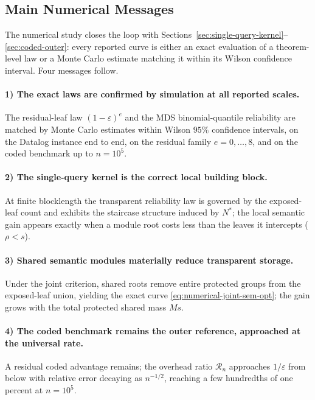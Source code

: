 \documentclass[journal]{IEEEtran}
\numberwithin{equation}{section}
\begin{document}
\subsection*{Main Numerical Messages}
The numerical study closes the loop with
Sections~\ref{sec:single-query-kernel}--\ref{sec:coded-outer}: every
reported curve is either an exact evaluation of a theorem-level law or a
Monte Carlo estimate matching it within its Wilson confidence interval.
Four messages follow.

\paragraph*{1) The exact laws are confirmed by simulation at all reported
scales.}
The residual-leaf law \((1-\varepsilon)^{e}\) and the MDS binomial-quantile
reliability are matched by Monte Carlo estimates within Wilson \(95\%\)
confidence intervals, on the Datalog instance end to end, on the residual
family \(e=0,\ldots,8\), and on the coded benchmark up to \(n=10^{5}\).

\paragraph*{2) The single-query kernel is the correct local building block.}
At finite blocklength the transparent reliability law is governed by the
exposed-leaf count and exhibits the staircase structure induced by
\(N^{*}\); the local semantic gain appears exactly when a module root costs
less than the leaves it intercepts (\(\rho<s\)).

\paragraph*{3) Shared semantic modules materially reduce transparent
storage.}
Under the joint criterion, shared roots remove entire protected groups from
the exposed-leaf union, yielding the exact curve
\eqref{eq:numerical-joint-sem-opt}; the gain grows with the total protected
shared mass \(Ms\).

\paragraph*{4) The coded benchmark remains the outer reference, approached
at the universal rate.}
A residual coded advantage remains; the overhead ratio \(\mathcal R_n\)
approaches \(1/\varepsilon\) from below with relative error decaying as
\(n^{-1/2}\), reaching a few hundredths of one percent at \(n=10^{5}\).
\end{document}
